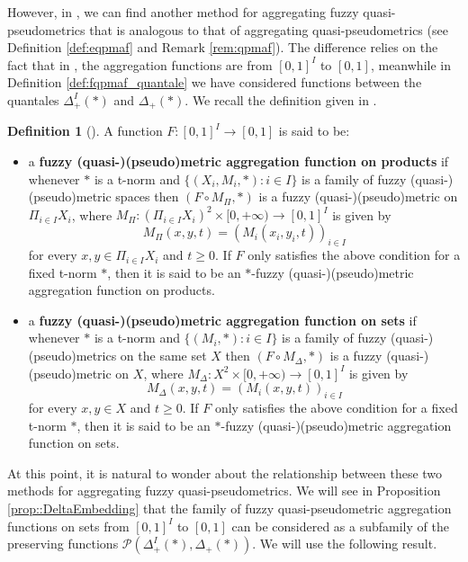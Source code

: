 \documentclass[11pt,a4paper]{amsart}
\theoremstyle{definition}
\newtheorem{definition}[theorem]{Definition}
\begin{document}
	
	
	However, in \cite{PRLVale21}, we can find another method for aggregating fuzzy quasi-pseudometrics that is analogous to that of aggregating quasi-pseudometrics (see Definition \ref{def:eqpmaf} and Remark \ref{rem:qpmaf}). The difference relies on the fact that in \cite{PRLVale21}, the aggregation functions are from $[0,1]^I$ to $[0,1]$, meanwhile in Definition \ref{def:fqpmaf_quantale} we have considered functions between the quantales $\Delta_+^I(\ast)$ and $\Delta_+(\ast).$ We recall the definition given in \cite{PRLVale21}.
	
	
	\begin{definition}[\cite{PRLVale21}] \label{def:fqpmaf}
		A function $F:[0,1]^{I}\rightarrow [0,1]$ is said to be:
		\begin{itemize}
			\item a \textbf{fuzzy (quasi-)(pseudo)metric aggregation function on pro\-ducts} if whenever $\ast$ is a t-norm and $\Big\lbrace (X_{i}, M_{i}, \ast): i \in I\Big\rbrace$ is a family of fuzzy (quasi-)(pseudo)metric spaces then $(F \circ M_\Pi, \ast)$ is a fuzzy (quasi-)(pseudo)metric on $\Pi_{i \in I}X_{i}$, where $M_\Pi: (\Pi_{i \in I}X_{i})^{2} \times [0, +\infty) \rightarrow [0,1]^{I}$ is given by
			$$M_\Pi(x,y,t)=(M_{i}(x_{i}, y_{i}, t))_{i\in I}$$
			for every $x, y \in \Pi_{i \in I}X_{i}$ and $t \geq 0$.
			If $F$ only satisfies the above condition for a fixed t-norm $\ast$, then it is said to be an $\ast$-fuzzy \mbox{(quasi-)}(pseudo)metric aggregation function on products.
			\item a \textbf{fuzzy (quasi-)(pseudo)metric aggregation function on sets} if whenever $\ast$ is a t-norm and $\Big\lbrace (M_{i}, \ast) : i \in I \Big\rbrace $ is a family of fuzzy (quasi-)(pseudo)metrics on the same set $X$ then $(F \circ M_\Delta, \ast)$ is a fuzzy (quasi-)(pseudo)metric on $X$, where $M_\Delta: X^{2} \times [0,+\infty) \rightarrow [0,1]^{I}$ is given by 
			$$M_\Delta(x,y,t)=(M_{i}(x,y,t))_{i\in I}$$
			for every $x,y \in X$ and $t \geq 0$. If $F$ only satisfies the above condition for a fixed t-norm $\ast$, then it is said to be an $\ast$-fuzzy \mbox{(quasi-)}(pseudo)metric aggregation function on sets.
		\end{itemize}
	\end{definition}
	
	
	At this point, it is natural to wonder about the relationship between these two methods for aggregating fuzzy quasi-pseudometrics.
	We will see in Proposition \ref{prop::DeltaEmbedding} that the family of fuzzy quasi-pseudometric aggregation functions on sets from $[0,1]^I$ to $[0,1]$ can be considered as a subfamily of the preserving functions $\mathscr{P}(\Delta_+^I(\ast),\Delta_+(\ast)).$ We will use the following result.
	
\end{document}

